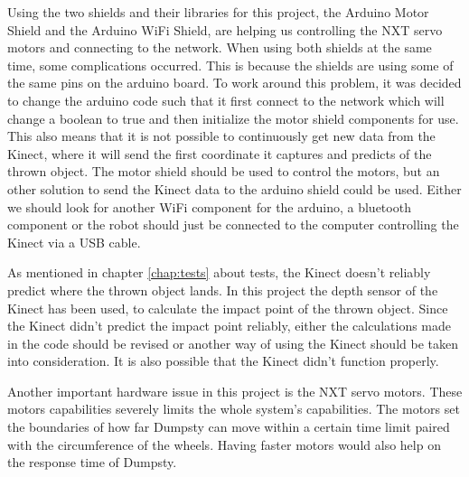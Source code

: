 Using the two shields and their libraries for this project, the Arduino Motor Shield and the Arduino WiFi Shield, are helping us controlling the NXT servo motors and connecting to the network. When using both shields at the same time, some complications occurred. This is because the shields are using some of the same pins on the arduino board. To work around this problem, it was decided to change the arduino code such that it first connect to the network which will change a boolean to true and then initialize the motor shield components for use. This also means that it is not possible to continuously get new data from the Kinect, where it will send the first coordinate it captures and predicts of the thrown object. \newline
The motor shield should be used to control the motors, but an other solution to send the Kinect data to the arduino shield could be used. Either we should look for another WiFi component for the arduino, a bluetooth component or the robot should just be connected to the computer controlling the Kinect via a USB cable. 


As mentioned in chapter \ref{chap:tests} about tests, the Kinect doesn’t reliably predict where the thrown object lands. In this project the depth sensor of the Kinect has been used, to calculate the impact point of the thrown object. Since the Kinect didn’t predict the impact point reliably, either the calculations made in the code should be revised or another way of using the Kinect should be taken into consideration. It is also possible that the Kinect didn’t function properly. 


Another important hardware issue in this project is the NXT servo motors. These motors capabilities severely limits the whole system’s capabilities. The motors set the boundaries of how far Dumpsty can move within a certain time limit paired with the circumference of the wheels. Having faster motors would also help on the response time of Dumpsty.


